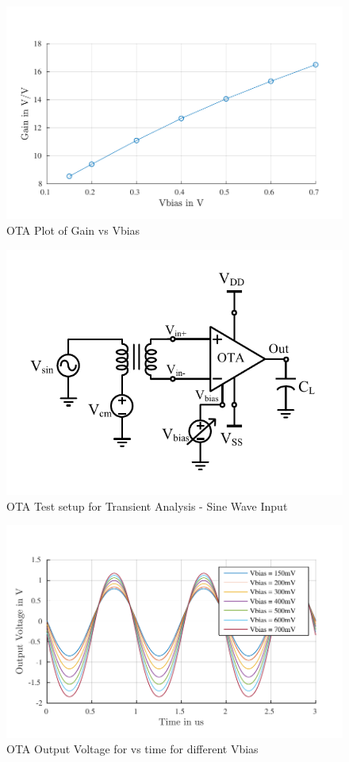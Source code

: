 \begin{figure} [H]
\centering
\includegraphics[scale=1]{Figures/Plots/OTA_Gain_Abs.pdf}
\caption{OTA Plot of Gain vs Vbias}
\end{figure}

\begin{figure} [H]
\centering
\includegraphics[scale=1]{Figures/Test_Benches/OTA/OTA_Sine.pdf}
\caption{OTA Test setup for Transient Analysis - Sine Wave Input}
\end{figure}

\begin{figure} [H]
\centering
\includegraphics[scale=1]{Figures/Plots/OTA_Sine.pdf}
\caption{OTA Output Voltage for vs time for different Vbias}
\end{figure}

